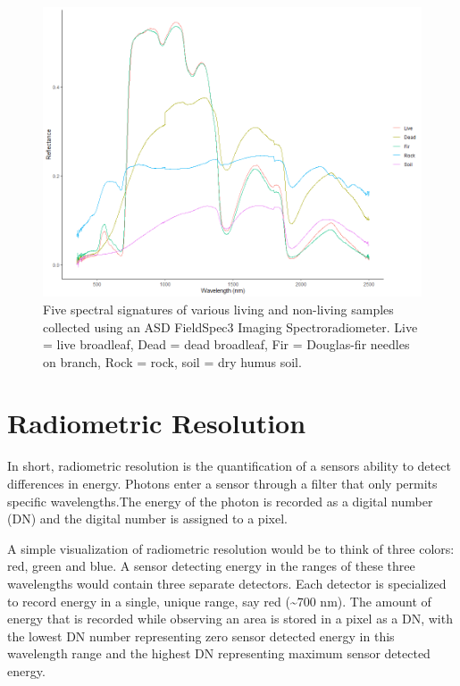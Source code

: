 \documentclass[
]{book}
\begin{document}
\begin{figure}
\includegraphics[width=2\linewidth]{images/11-spectralsig} \caption{Five spectral signatures of various living and non-living samples collected using an ASD FieldSpec3 Imaging Spectroradiometer. Live = live broadleaf, Dead = dead broadleaf, Fir = Douglas-fir needles on branch, Rock = rock, soil = dry humus soil.}\label{fig:11-specsig}
\end{figure}

\hypertarget{radiometric-resolution}{%
\section{Radiometric Resolution}\label{radiometric-resolution}}

In short, radiometric resolution is the quantification of a sensors
ability to detect differences in energy. Photons enter a sensor
through a filter that only permits specific wavelengths.The energy
of the photon is recorded as a digital number (DN) and the digital
number is assigned to a pixel.

A simple visualization of radiometric resolution would be to think of
three colors: red, green and blue. A sensor
detecting energy in the ranges of these three wavelengths would
contain three separate detectors. Each detector is specialized to record
energy in a single, unique range, say red (\textasciitilde700 nm). The amount of
energy that is recorded while observing an area is stored in a pixel
as a DN, with the lowest DN number representing zero sensor detected
energy in this wavelength range and the highest DN representing
maximum sensor detected energy.
\end{document}
